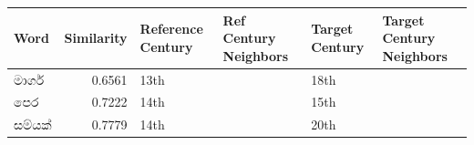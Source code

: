﻿\begin{tabular}{lrllll}
\toprule
Word & Similarity & Reference Century & Ref Century Neighbors & Target Century & Target Century Neighbors \\
\midrule
මාර්ග & 0.6561 & 13th & & 18th & \\
පෙර & 0.7222 & 14th & & 15th & \\
සම්යක් & 0.7779 & 14th & & 20th & \\
\bottomrule
\end{tabular}
